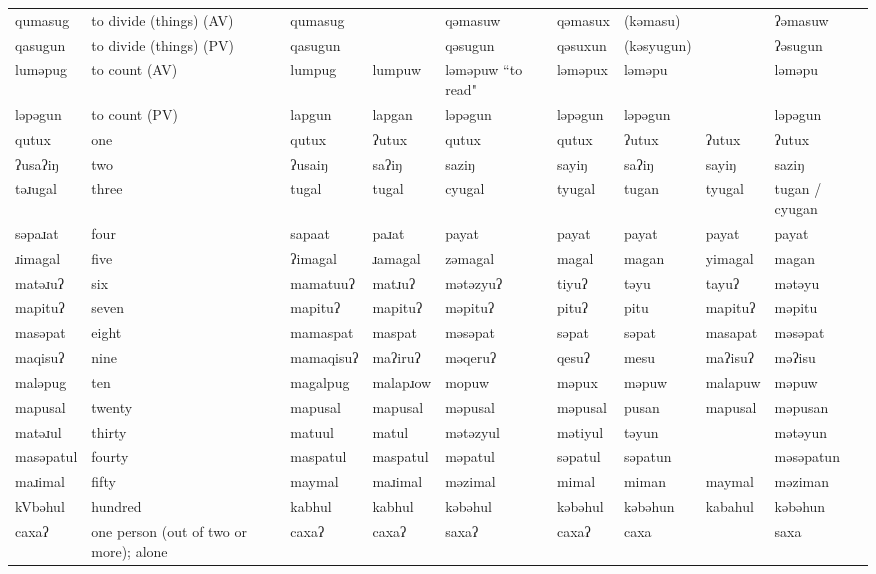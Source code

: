 \begin{landscape}
\begin{longtable}{*{9}{p{}}}
\text{*}qumasug & to divide (things) (AV) & qumasug &  & qəmasuw & qəmasux & (kəmasu) &  & ʔəmasuw\\
\text{*}qasugun & to divide (things) (PV) & qasugun &  & qəsugun & qəsuxun & (kəsyugun) &  & ʔəsugun\\
\text{*}luməpug & to count (AV) & lumpug & lumpuw & ləməpuw ``to read" & ləməpux & ləməpu &  & ləməpu\\
\text{*}ləpəgun & to count (PV) & lapgun & lapgan & ləpəgun & ləpəgun & ləpəgun &  & ləpəgun\\
\text{*}qutux & one & qutux & ʔutux & qutux & qutux & ʔutux & ʔutux & ʔutux\\
\text{*}ʔusaʔiŋ & two & ʔusaiŋ & saʔiŋ & saziŋ & sayiŋ & saʔiŋ & sayiŋ & saziŋ\\
\text{*}təɹugal & three & tugal & tugal & cyugal & tyugal & tugan & tyugal & tugan / cyugan\\
\text{*}səpaɹat & four & sapaat & paɹat & payat & payat & payat & payat & payat\\
\text{*}ɹimagal & five & ʔimagal & ɹamagal & zəmagal & magal & magan & yimagal & magan\\
\text{*}matəɹuʔ & six & mamatuuʔ & matɹuʔ & mətəzyuʔ & tiyuʔ & təyu & tayuʔ & mətəyu\\
\text{*}mapituʔ & seven & mapituʔ & mapituʔ & məpituʔ & pituʔ & pitu & mapituʔ & məpitu\\
\text{*}masəpat & eight & mamaspat & maspat & məsəpat & səpat & səpat & masapat & məsəpat\\
\text{*}maqisuʔ & nine & mamaqisuʔ & maʔiruʔ & məqeruʔ & qesuʔ & mesu & maʔisuʔ & məʔisu\\
\text{*}maləpug & ten & magalpug & malapɹow & mopuw & məpux & məpuw & malapuw & məpuw\\
\text{*}mapusal & twenty & mapusal & mapusal & məpusal & məpusal & pusan & mapusal & məpusan\\
\text{*}matəɹul & thirty & matuul & matul & mətəzyul & mətiyul & təyun &  & mətəyun\\
\text{*}masəpatul & fourty & maspatul & maspatul & məpatul & səpatul & səpatun &  & məsəpatun\\
\text{*}maɹimal & fifty & maymal & maɹimal & məzimal & mimal & miman & maymal & məziman\\
\text{*}kVbəhul & hundred & kabhul & kabhul & kəbəhul & kəbəhul & kəbəhun & kabahul & kəbəhun\\
\text{*}caxaʔ & one person (out of two or more); alone & caxaʔ & caxaʔ & saxaʔ & caxaʔ & caxa &  & saxa\\

\end{longtable}
\end{landscape}
